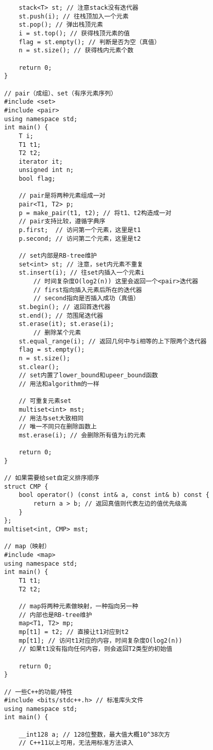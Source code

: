 \begin{lstlisting}
    stack<T> st; // 注意stack没有迭代器
    st.push(i); // 往栈顶加入一个元素
    st.pop(); // 弹出栈顶元素
    i = st.top(); // 获得栈顶元素的值
    flag = st.empty(); // 判断是否为空（真值）
    n = st.size(); // 获得栈内元素个数
    
    return 0;
}

// pair（成组）、set（有序元素序列）
#include <set>
#include <pair>
using namespace std;
int main() {
    T i;
    T1 t1;
    T2 t2;
    iterator it;
    unsigned int n;
    bool flag;
    
    // pair是将两种元素组成一对
    pair<T1, T2> p;
    p = make_pair(t1, t2); // 将t1、t2构造成一对
    // pair支持比较，遵循字典序
    p.first;  // 访问第一个元素，这里是t1
    p.second; // 访问第二个元素，这里是t2
    
    // set内部是RB-tree维护
    set<int> st; // 注意，set内元素不重复
    st.insert(i); // 往set内插入一个元素i
    	// 时间复杂度O(log2(n)) 这里会返回一个<pair>迭代器
    	// first指向插入元素后所在的迭代器
    	// second指向是否插入成功（真值）
    st.begin(); // 返回首迭代器
    st.end(); // 范围尾迭代器
    st.erase(it); st.erase(i);
    	// 删除某个元素
    st.equal_range(i); // 返回几何中与i相等的上下限两个迭代器
    flag = st.empty(); 
    n = st.size();
    st.clear();
    // set内置了lower_bound和upeer_bound函数
    // 用法和algorithm的一样
    
    // 可重复元素set
    multiset<int> mst;
    // 用法与set大致相同
    // 唯一不同只在删除函数上
    mst.erase(i); // 会删除所有值为i的元素
    
    return 0;
}

// 如果需要给set自定义排序顺序
struct CMP {
    bool operator() (const int& a, const int& b) const {
        return a > b; // 返回真值则代表左边的值优先级高
    }
};
multiset<int, CMP> mst;

// map（映射）
#include <map>
using namespace std;
int main() {
    T1 t1;
    T2 t2;
    
    // map将两种元素做映射，一种指向另一种
    // 内部也是RB-tree维护
    map<T1, T2> mp;
    mp[t1] = t2; // 直接让t1对应到t2
   	mp[t1]; // 访问t1对应的内容，时间复杂度O(log2(n))
    // 如果t1没有指向任何内容，则会返回T2类型的初始值
    
    return 0;
}

// 一些C++的功能/特性
#include <bits/stdc++.h> // 标准库头文件
using namespace std;
int main() {
    
    __int128 a; // 128位整数，最大值大概10^38次方
   	// C++11以上可用，无法用标准方法读入
    

\end{lstlisting}
